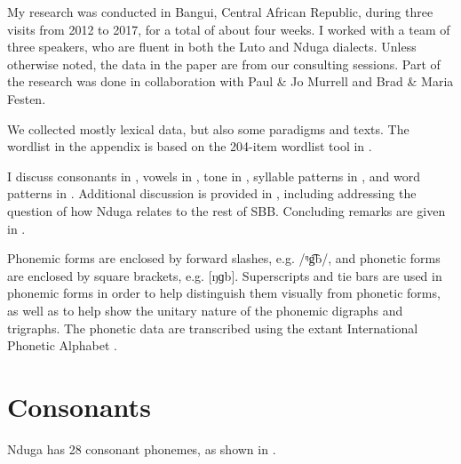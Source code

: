 \documentclass[output=paper,colorlinks,citecolor=brown
]{langscibook}
\begin{document}
My research was conducted in Bangui, Central African Republic, during three visits from 2012 to 2017, for a total of about four weeks. I worked with a team of three speakers, who are fluent in both the Luto and Nduga dialects. Unless otherwise noted, the data in the paper are from our consulting sessions. Part of the research was done in collaboration with Paul \& Jo Murrell and Brad \& Maria Festen.

We collected mostly lexical data, but also some paradigms and texts. The wordlist in the appendix is based on the 204-item wordlist tool in \citet{monino1988}.

I discuss consonants in , vowels in , tone in , syllable patterns in , and word patterns in . Additional discussion is provided in , including addressing the question of how Nduga relates to the rest of SBB. Concluding remarks are given in .

Phonemic forms are enclosed by forward slashes, e.g. /ᵑg͡b/, and phonetic forms are enclosed by square brackets, e.g. [ŋɡb]. Superscripts and tie bars are used in phonemic forms in order to help distinguish them visually from phonetic forms, as well as to help show the unitary nature of the phonemic digraphs and trigraphs. The phonetic data are transcribed using the extant International Phonetic Alphabet \citep{ipa2006}.

\section{Consonants}
\label{sec:olson:consonants}

Nduga has 28 consonant phonemes, as shown in .
\end{document}
